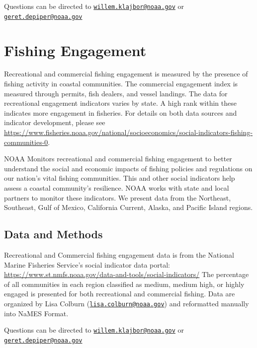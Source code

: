 \documentclass[
]{book}
\begin{document}
Questions can be directed to \href{mailto:willem.klajbor@noaa.gov}{\nolinkurl{willem.klajbor@noaa.gov}} or \href{mailto:geret.depiper@noaa.gov}{\nolinkurl{geret.depiper@noaa.gov}}

\hypertarget{fishing-engagement}{%
\chapter{Fishing Engagement}\label{fishing-engagement}}

Recreational and commercial fishing engagement is measured by the presence of fishing activity in coastal communities. The commercial engagement index is measured through permits, fish dealers, and vessel landings. The data for recreational engagement indicators varies by state. A high rank within these indicates more engagement in fisheries. For details on both data sources and indicator development, please see \url{https://www.fisheries.noaa.gov/national/socioeconomics/social-indicators-fishing-communities-0}.

NOAA Monitors recreational and commercial fishing engagement to better understand the social and economic impacts of fishing policies and regulations on our nation's vital fishing communities. This and other social indicators help assess a coastal community's resilience. NOAA works with state and local partners to monitor these indicators. We present data from the Northeast, Southeast, Gulf of Mexico, California Current, Alaska, and Pacific Island regions.

\hypertarget{data-and-methods-2}{%
\section{Data and Methods}\label{data-and-methods-2}}

Recreational and Commercial fishing engagement data is from the National Marine Fisheries Service's social indicator data portal: \url{https://www.st.nmfs.noaa.gov/data-and-tools/social-indicators/} The percentage of all communities in each region classified as medium, medium high, or highly engaged is presented for both recreational and commercial fishing. Data are organized by Lisa Colburn (\href{mailto:lisa.colburn@noaa.gov}{\nolinkurl{lisa.colburn@noaa.gov}}) and reformatted manually into NaMES Format.

Questions can be directed to \href{mailto:willem.klajbor@noaa.gov}{\nolinkurl{willem.klajbor@noaa.gov}} or \href{mailto:geret.depiper@noaa.gov}{\nolinkurl{geret.depiper@noaa.gov}}
\end{document}
